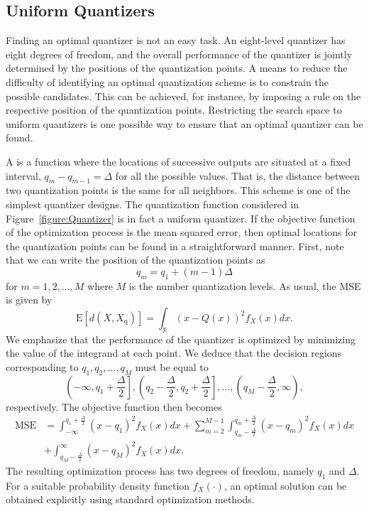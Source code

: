\subsection{Uniform Quantizers}
\label{section:UniformQuantizers}

Finding an optimal quantizer is not an easy task.
An eight-level quantizer has eight degrees of freedom, and the overall performance of the quantizer is jointly determined by the positions of the quantization points.
A means to reduce the difficulty of identifying an optimal quantization scheme is to constrain the possible candidates.
This can be achieved, for instance, by imposing a rule on the respective position of the quantization points.
Restricting the search space to uniform quantizers is one possible way to ensure that an optimal quantizer can be found.

A  is a function where the locations of successive outputs are situated at a fixed interval, $q_m - q_{m-1} = \Delta$ for all the possible values.
That is, the distance between two quantization points is the same for all neighbors.
This scheme is one of the simplest quantizer designs.
The quantization function considered in Figure~\ref{figure:Quantizer} is in fact a uniform quantizer.
If the objective function of the optimization process is the mean squared error, then optimal locations for the quantization points can be found in a straightforward manner.
First, note that we can write the position of the quantization points as
\begin{equation*}
q_m = q_1 + (m-1) \Delta
\end{equation*}
for $m = 1, 2, \ldots, M$ where $M$ is the number quantization levels.
As usual, the MSE is given by
\begin{equation*}
\mathrm{E} [ d(X, X_{\mathrm{q}}) ]
= \int_{\mathbb{R}} (x - Q(x))^2 f_X(x) dx .
\end{equation*}
We emphasize  that the performance of the quantizer is optimized by minimizing the value of the integrand at each point.
We deduce that the decision regions corresponding to $q_1, q_2, \ldots, q_M$ must be equal to
\begin{equation*}
\left( - \infty, q_1 + \frac{\Delta}{2} \right],
\left( q_2 - \frac{\Delta}{2}, q_2 + \frac{\Delta}{2} \right],
\ldots,
\left( q_M - \frac{\Delta}{2}, \infty \right) ,
\end{equation*}
respectively.
The objective function then becomes
\begin{equation} \label{equation:UniformQuantizerMSE}
\begin{split}
\text{MSE} &= \int_{-\infty}^{q_1 + \frac{\Delta}{2}} (x - q_1)^2 f_X(x) dx
+ \sum_{m=2}^{M-1}
\int_{q_m - \frac{\Delta}{2}}^{q_m + \frac{\Delta}{2}}
(x - q_m)^2 f_X(x) dx \\
&+ \int_{q_M - \frac{\Delta}{2}}^{\infty} (x - q_M)^2 f_X(x) dx .
\end{split}
\end{equation}
The resulting optimization process has two degrees of freedom, namely $q_1$ and $\Delta$.
For a suitable probability density function $f_X(\cdot)$, an optimal solution can be obtained explicitly using standard optimization methods.

